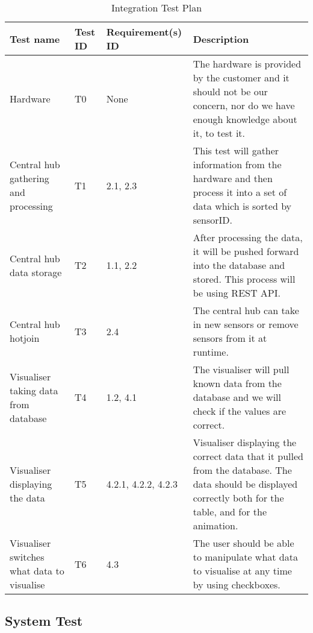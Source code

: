 \documentclass[../document]{subfiles}
\begin{document}
\begin{table}[H]
\caption{Integration Test Plan}
\centering
\begin{tabularx}{\textwidth}{|L{2cm}|l|L{2.2cm}|X|}
	\hline
	Test name
	&Test ID
	&Requirement(s) ID
	&Description
	\\ \hline Hardware
	&T0
	&None
	&The hardware is provided by the customer and it should not be our concern, nor do we have enough knowledge about it, to test it.
	\\ \hline Central hub gathering and processing
	&T1
	&2.1, 2.3
	&This test will gather information from the hardware and then process it into a set of data which is sorted by sensorID.
	\\ \hline Central hub data storage
	&T2
	&1.1, 2.2
	&After processing the data, it will be pushed forward into the database and stored. This process will be using \gls{REST} \gls{API}.
	\\ \hline Central hub hotjoin
	&T3
	&2.4
	&The central hub can take in new sensors or remove sensors from it at runtime.
	\\ \hline Visualiser taking data from database
	&T4
	&1.2, 4.1
	&The visualiser will pull known data from the database and we will check if the values are correct.
	\\ \hline Visualiser displaying the data
	&T5
	&4.2.1, 4.2.2, 4.2.3
	&Visualiser displaying the correct data that it pulled from the database. The data should be displayed correctly both for the table, and for the animation.
	\\ \hline Visualiser switches what data to visualise
	&T6
	&4.3
	&The user should be able to manipulate what data to visualise at any time by using checkboxes.
	\\ \hline 
\end{tabularx}
\end{table}

\subsection{System Test}
\end{document}
